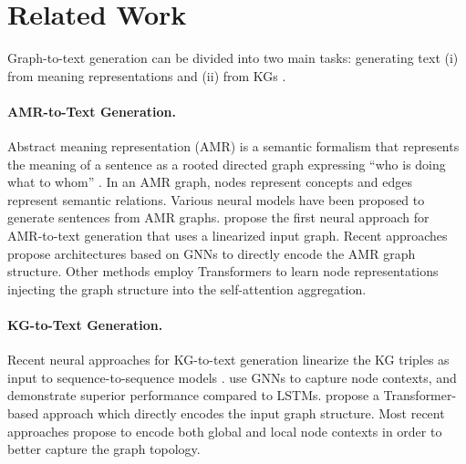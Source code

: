 \documentclass[11pt,a4paper]{article}
\begin{document}
\section{Related Work}

Graph-to-text generation can be divided into two main tasks: generating text (i) from meaning representations \cite{konsas_17} and (ii) from KGs \cite{gardent-etal-2017-webnlg}.
\vspace{-0.3cm}
 \paragraph{AMR-to-Text Generation.} Abstract meaning representation (AMR) is a semantic formalism that represents the meaning of a sentence as a rooted directed graph expressing ``who is doing what to whom'' \cite{banarescu-etal-2013-abstract}. In an AMR graph, nodes represent concepts and edges represent semantic relations. Various neural models have been proposed to generate sentences from AMR graphs. \citet{konsas_17} propose the first neural approach for AMR-to-text generation that uses a linearized input graph. Recent approaches \cite{song-etal-acl2018, beck-etal-2018-acl2018, damonte-cohen-2019-structural, ribeiro-etal-2019-enhancing, zhao-etal-2020-bridging} propose architectures based on GNNs to directly encode the AMR graph structure. Other methods \cite{zhu-etal-2019-modeling,cai-lam-2020-graph, doi:10.116200297, song-etal-2020-structural, yao-etal-2020-heterogeneous} employ Transformers to learn node representations injecting the graph structure into the self-attention aggregation. 
\vspace{-0.2cm}
\paragraph{KG-to-Text Generation.} Recent neural approaches for KG-to-text generation linearize the KG triples as input to sequence-to-sequence models \cite{trisedya-etal-2018-gtr, moryossef-etal-2019-step, castro-ferreira-etal-2019-neural}. \citet{marcheggiani-icnl18} use GNNs to capture node contexts, and demonstrate superior performance compared to LSTMs. \citet{koncel-kedziorski-etal-2019-text} propose a Transformer-based approach which directly encodes the input graph structure. Most recent approaches \citep{ribeiro2020modeling,schmitt2020modeling} propose to encode both global and local node contexts in order to better capture the graph topology.
\vspace{-0.2cm}
\end{document}
